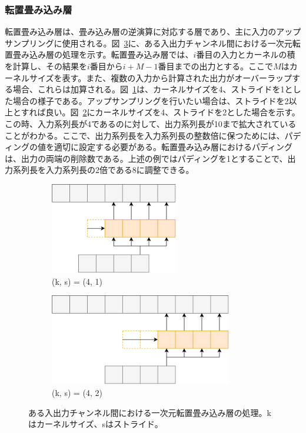\documentclass[12pt]{jarticle}
\numberwithin{equation}{section}    %
\numberwithin{figure}{section}      %
\numberwithin{table}{section}      %
\begin{document}
\subsubsection{転置畳み込み層}
転置畳み込み層は、畳み込み層の逆演算に対応する層であり、主に入力のアップサンプリングに使用される。図~\ref{sec3:fig:tconv_variations}に、ある入出力チャンネル間における一次元転置畳み込み層の処理を示す。転置畳み込み層では、$i$番目の入力とカーネルの積を計算し、その結果を$i$番目から$i + M - 1$番目までの出力とする。ここで$M$はカーネルサイズを表す。また、複数の入力から計算された出力がオーバーラップする場合、これらは加算される。図~\ref{sec3:fig:tconv1}は、カーネルサイズを4、ストライドを1とした場合の様子である。アップサンプリングを行いたい場合は、ストライドを2以上とすれば良い。図~\ref{sec3:fig:tconv2}にカーネルサイズを4、ストライドを2とした場合を示す。この時、入力系列長が4であるのに対して、出力系列長が10まで拡大されていることがわかる。ここで、出力系列長を入力系列長の整数倍に保つためには、パディングの値を適切に設定する必要がある。転置畳み込み層におけるパディングは、出力の両端の削除数である。上述の例ではパディングを1とすることで、出力系列長を入力系列長の2倍である8に調整できる。

\begin{figure}[tb]
    \centering
    \begin{subfigure}[b]{0.48\textwidth}
        \centering
        \includegraphics[height=4cm]{./figure/sec3/tconv1.drawio.png}
        \caption{(k, s) = (4, 1)}
        \label{sec3:fig:tconv1}
    \end{subfigure}
    \begin{subfigure}[b]{0.48\textwidth}
        \centering
        \includegraphics[height=4cm]{./figure/sec3/tconv2.drawio.png}
        \caption{(k, s) = (4, 2)}
        \label{sec3:fig:tconv2}
    \end{subfigure}
    \caption{ある入出力チャンネル間における一次元転置畳み込み層の処理。kはカーネルサイズ、sはストライド。}
    \label{sec3:fig:tconv_variations}
\end{figure}
\end{document}
